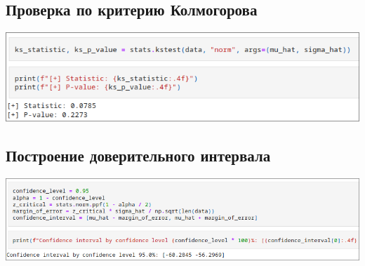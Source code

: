 \documentclass[a4paper]{article}
\begin{document}
    \subsection*{Проверка по критерию Колмогорова}
    \includegraphics[width=\textwidth]{images/kolmogorov.png}

    \subsection*{Построение доверительного интервала}
    \includegraphics[width=\textwidth]{images/confidence_interval.png} 
\end{document}
